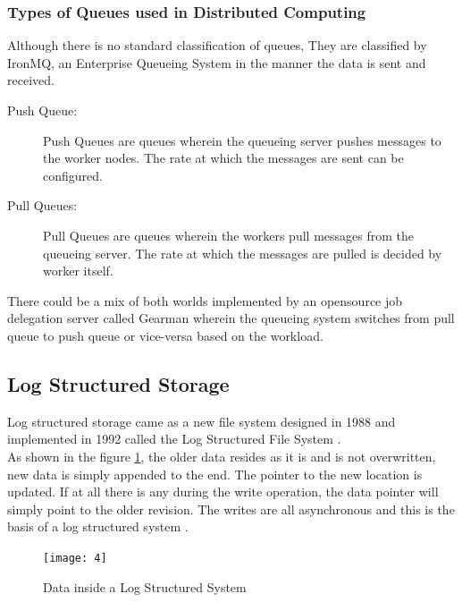 \documentclass[12pt,a4paper]{article}
\begin{document}
\subsubsection{Types of Queues used in Distributed Computing}
Although there is no standard classification of queues, They are classified by IronMQ, an Enterprise Queueing System in the manner the data is sent and received.

\begin{description}
	\item [Push Queue:] 
	 		Push Queues are queues wherein the queueing server pushes messages to the
	 		worker nodes. The rate at which the messages are sent can be configured.
	\item [Pull Queues:]
			 Pull Queues are queues wherein the workers pull messages from the queueing server. The rate at which the messages are pulled is decided by worker itself.
	
\end{description}

There could be a mix of both worlds implemented by an opensource job delegation server called Gearman wherein the queueing system switches from pull queue to push queue or vice-versa based on the workload.





\subsection{Log Structured Storage}

Log structured storage came as a new file system designed in 1988 and implemented in 1992 called the Log Structured File System \citep{rosenblum1992design}.\\

As shown in the figure \ref{fig:gdull04}, the older data resides as it is and is not overwritten, new data is simply appended to the end. The pointer to the new location is updated. If at all there is any during the write operation, the data pointer will simply point to the older revision. The writes are all asynchronous and this is the basis of a log structured system  \citep{rosenblum1992design}. 

 \begin{figure}
 	\centering
 	\textbf{}\par\medskip
 	\texttt{[image: 4]}
 	\caption{Data inside a Log Structured System}
 	\label{fig:gdull04}
 \end{figure}
\end{document}
